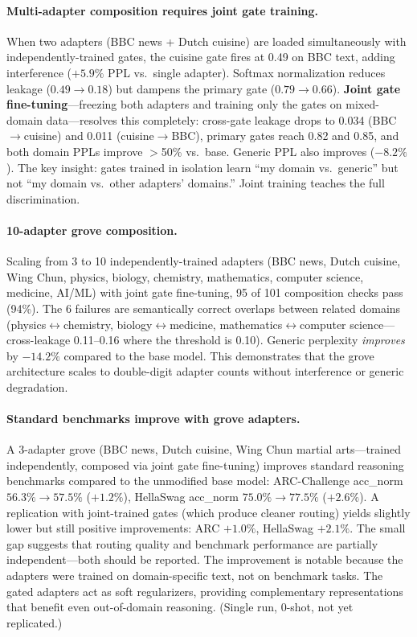 \documentclass{article}
\begin{document}
\paragraph{Multi-adapter composition requires joint gate training.}
When two adapters (BBC news + Dutch cuisine) are loaded simultaneously with
independently-trained gates, the cuisine gate fires at 0.49 on BBC text,
adding interference ($+5.9\%$ PPL vs.\ single adapter). Softmax normalization
reduces leakage ($0.49 \to 0.18$) but dampens the primary gate ($0.79 \to 0.66$).
\textbf{Joint gate fine-tuning}---freezing both adapters and training only the
gates on mixed-domain data---resolves this completely: cross-gate leakage drops
to 0.034 (BBC$\to$cuisine) and 0.011 (cuisine$\to$BBC), primary gates reach
0.82 and 0.85, and both domain PPLs improve $>$50\% vs.\ base. Generic PPL also
improves ($-8.2\%$). The key insight: gates trained in isolation learn ``my domain
vs.\ generic'' but not ``my domain vs.\ other adapters' domains.'' Joint training
teaches the full discrimination.

\paragraph{10-adapter grove composition.}
Scaling from 3 to 10 independently-trained adapters (BBC news, Dutch
cuisine, Wing Chun, physics, biology, chemistry, mathematics, computer
science, medicine, AI/ML) with joint gate fine-tuning, 95 of 101
composition checks pass (94\%). The 6 failures are semantically correct
overlaps between related domains (physics$\leftrightarrow$chemistry,
biology$\leftrightarrow$medicine, mathematics$\leftrightarrow$computer
science---cross-leakage 0.11--0.16 where the threshold is 0.10).
Generic perplexity \emph{improves} by $-14.2\%$ compared to the base
model. This demonstrates that the grove architecture scales to
double-digit adapter counts without interference or generic degradation.

\paragraph{Standard benchmarks improve with grove adapters.}
A 3-adapter grove (BBC news, Dutch cuisine, Wing Chun martial arts---trained
independently, composed via joint gate fine-tuning) improves standard
reasoning benchmarks compared to the unmodified base model:
ARC-Challenge acc\_norm $56.3\% \to 57.5\%$ ($+1.2\%$),
HellaSwag acc\_norm $75.0\% \to 77.5\%$ ($+2.6\%$).
A replication with joint-trained gates (which produce cleaner routing)
yields slightly lower but still positive improvements: ARC $+1.0\%$,
HellaSwag $+2.1\%$. The small gap suggests that routing quality and
benchmark performance are partially independent---both should be
reported. The improvement is notable because the adapters were trained
on domain-specific text, not on benchmark tasks. The gated adapters act
as soft regularizers, providing complementary representations that
benefit even out-of-domain reasoning. (Single run, 0-shot, not yet
replicated.)
\end{document}
